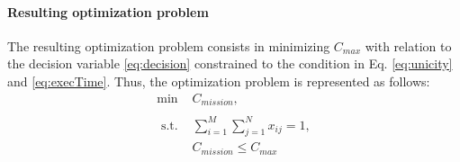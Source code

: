 \documentclass[conference,harvard,brazil,english]{sbatex}
\begin{document}
\paragraph{Resulting optimization problem}

The resulting optimization problem consists in minimizing $C_{max}$ with relation to the decision variable \eqref{eq:decision} constrained to the condition in Eq. \eqref{eq:unicity} and \eqref{eq:execTime}. Thus, the optimization problem is represented as follows:
\begin{equation}
	\label{eq:optproblem}
	\begin{array}{ccc}
		\min & C_{mission},  \\
  \\
		\textrm{ s.t. } & \sum_{i=1}^{M}{\sum_{j=1}^{N}{x_{ij}}}=1, \\
		& C_{mission}\leq C_{max}
 \\
	\end{array}
\end{equation}	
%
%
%
%
%
%
%
%
\end{document}

